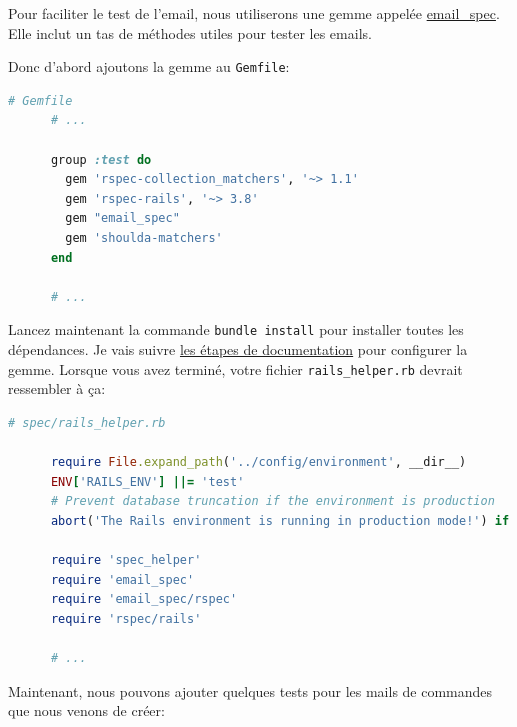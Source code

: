 \documentclass[]{report}
\begin{document}
    Pour faciliter le test de l'email, nous utiliserons une gemme appelée \href{https://github.com/email-spec/email-spec}{email\_spec}. Elle inclut un tas de méthodes utiles pour tester les emails.

    Donc d'abord ajoutons la gemme au \verb|Gemfile|:

    \begin{scriptsize}
      \begin{lstlisting}[language=ruby]
      # Gemfile
      # ...

      group :test do
        gem 'rspec-collection_matchers', '~> 1.1'
        gem 'rspec-rails', '~> 3.8'
        gem "email_spec"
        gem 'shoulda-matchers'
      end

      # ...
      \end{lstlisting}
    \end{scriptsize}

    Lancez maintenant la commande \verb|bundle install| pour installer toutes les dépendances. Je vais suivre \href{https://github.com/email-spec/email-spec#rspec-31}{les étapes de documentation} pour configurer la gemme. Lorsque vous avez terminé, votre fichier \verb|rails_helper.rb| devrait ressembler à ça:

    \begin{scriptsize}
      \begin{lstlisting}[language=ruby]
      # spec/rails_helper.rb

      require File.expand_path('../config/environment', __dir__)
      ENV['RAILS_ENV'] ||= 'test'
      # Prevent database truncation if the environment is production
      abort('The Rails environment is running in production mode!') if Rails.env.production?

      require 'spec_helper'
      require 'email_spec'
      require 'email_spec/rspec'
      require 'rspec/rails'

      # ...
      \end{lstlisting}
    \end{scriptsize}

    Maintenant, nous pouvons ajouter quelques tests pour les mails de commandes que nous venons de créer:
\end{document}
